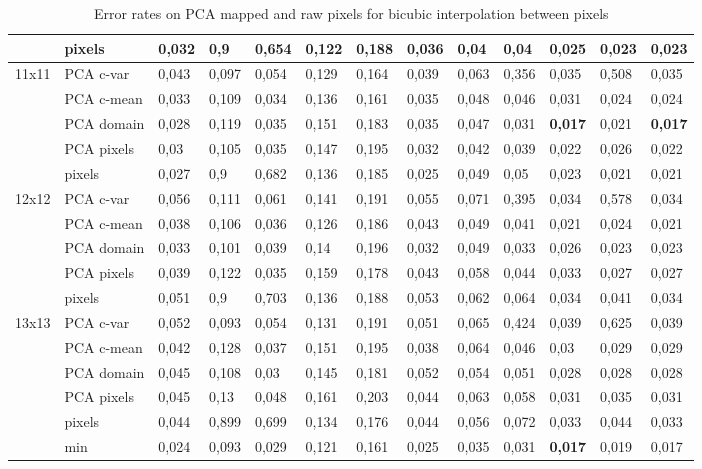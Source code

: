\documentclass{article}
\begin{document}
\begin{table}[H]
\begin{tabular}{l|l|llllllllll|l|}
          & pixels & 0,032 & 0,9   & 0,654 & 0,122 & 0,188 & 0,036 & 0,04  & 0,04  & 0,025 & 0,023 & 0,023 \\ \hline
    11x11 & PCA c-var & 0,043 & 0,097 & 0,054 & 0,129 & 0,164 & 0,039 & 0,063 & 0,356 & 0,035 & 0,508 & 0,035 \\
          & PCA c-mean & 0,033 & 0,109 & 0,034 & 0,136 & 0,161 & 0,035 & 0,048 & 0,046 & 0,031 & 0,024 & 0,024 \\
          & PCA domain & 0,028 & 0,119 & 0,035 & 0,151 & 0,183 & 0,035 & 0,047 & 0,031 & \textbf{0,017} & 0,021 & \textbf{0,017} \\
          & PCA pixels & 0,03  & 0,105 & 0,035 & 0,147 & 0,195 & 0,032 & 0,042 & 0,039 & 0,022 & 0,026 & 0,022 \\
          & pixels & 0,027 & 0,9   & 0,682 & 0,136 & 0,185 & 0,025 & 0,049 & 0,05  & 0,023 & 0,021 & 0,021 \\ \hline
    12x12 & PCA c-var & 0,056 & 0,111 & 0,061 & 0,141 & 0,191 & 0,055 & 0,071 & 0,395 & 0,034 & 0,578 & 0,034 \\
          & PCA c-mean & 0,038 & 0,106 & 0,036 & 0,126 & 0,186 & 0,043 & 0,049 & 0,041 & 0,021 & 0,024 & 0,021 \\
          & PCA domain & 0,033 & 0,101 & 0,039 & 0,14  & 0,196 & 0,032 & 0,049 & 0,033 & 0,026 & 0,023 & 0,023 \\
          & PCA pixels & 0,039 & 0,122 & 0,035 & 0,159 & 0,178 & 0,043 & 0,058 & 0,044 & 0,033 & 0,027 & 0,027 \\
          & pixels & 0,051 & 0,9   & 0,703 & 0,136 & 0,188 & 0,053 & 0,062 & 0,064 & 0,034 & 0,041 & 0,034 \\ \hline
    13x13 & PCA c-var & 0,052 & 0,093 & 0,054 & 0,131 & 0,191 & 0,051 & 0,065 & 0,424 & 0,039 & 0,625 & 0,039 \\
          & PCA c-mean & 0,042 & 0,128 & 0,037 & 0,151 & 0,195 & 0,038 & 0,064 & 0,046 & 0,03  & 0,029 & 0,029 \\
          & PCA domain & 0,045 & 0,108 & 0,03  & 0,145 & 0,181 & 0,052 & 0,054 & 0,051 & 0,028 & 0,028 & 0,028 \\
          & PCA pixels & 0,045 & 0,13  & 0,048 & 0,161 & 0,203 & 0,044 & 0,063 & 0,058 & 0,031 & 0,035 & 0,031 \\
          & pixels & 0,044 & 0,899 & 0,699 & 0,134 & 0,176 & 0,044 & 0,056 & 0,072 & 0,033 & 0,044 & 0,033 \\ \hline
          & min & 0,024 & 0,093 & 0,029 & 0,121 & 0,161 & 0,025 & 0,035 & 0,031 & \textbf{0,017} & 0,019 & 0,017 \\
    \hline
    \end{tabular}%
		\caption{Error rates on PCA mapped and raw pixels for bicubic interpolation between pixels}  \label{table: errorrates of PCA mappings bicubic}%
\end{table}%
\end{document}
